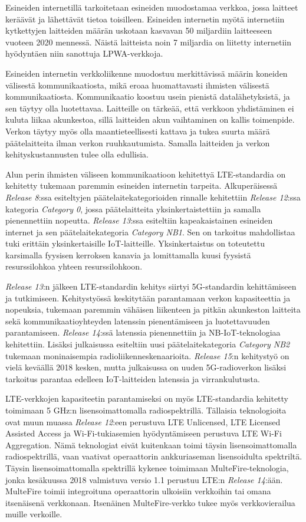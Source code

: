 \documentclass[finnish, 12pt, a4paper, elec, latin1, utf8, online]{aaltothesis}
\begin{document}
Esineiden internetillä tarkoitetaan  esineiden muodostamaa verkkoa, jossa laitteet keräävät ja lähettävät tietoa toisilleen. Esineiden internetin myötä internetiin kytkettyjen laitteiden määrän uskotaan kasvavan 50 miljardiin laitteeseen vuoteen 2020 mennessä. Näistä laitteista noin 7 miljardia on liitetty internetiin hyödyntäen niin sanottuja LPWA-verkkoja.

Esineiden internetin verkkoliikenne muodostuu merkittävissä määrin koneiden välisestä kommunikaatiosta, mikä eroaa huomattavasti ihmisten välisestä kommunikaatiosta. Kommunikaatio koostuu usein pienistä datalähetyksistä, ja sen täytyy olla luotettavaa. Laitteille on tärkeää, että verkkoon yhdistäminen ei kuluta liikaa akunkestoa, sillä laitteiden akun vaihtaminen on kallis toimenpide. Verkon täytyy myös olla maantieteellisesti kattava ja tukea suurta määrä päätelaitteita ilman verkon ruuhkautumista. Samalla laitteiden ja verkon kehityskustannusten tulee olla edullisia.

Alun perin ihmisten väliseen kommunikaatioon kehitettyä LTE-standardia on kehitetty tukemaan paremmin esineiden internetin tarpeita. Alkuperäisessä \textit{Release 8}:ssa esiteltyjen päätelaitekategorioiden rinnalle kehitettiin \textit{Release 12}:ssa kategoria \textit{Category 0}, jossa päätelaitteita yksinkertaistettiin ja samalla pienennettiin nopeutta. \textit{Release 13}:ssa esiteltiin kapeakaistainen esineiden internet ja sen päätelaitekategoria \textit{Category NB1}. Sen on tarkoitus mahdollistaa tuki erittäin yksinkertaisille IoT-laitteille. Yksinkertaistus on toteutettu karsimalla fyysisen kerroksen kanavia ja lomittamalla kuusi fyysistä resurssilohkoa yhteen resurssilohkoon.

\textit{Release 13}:n jälkeen LTE-standardin kehitys siirtyi 5G-standardin kehittämiseen ja tutkimiseen. Kehitystyössä keskitytään parantamaan verkon kapasiteettia ja nopeuksia, tukemaan paremmin vähäisen liikenteen ja pitkän akunkeston laitteita sekä kommunikaatioyhteyden latenssin pienentämiseen ja luotettavuuden parantamiseen. \textit{Release 14}:ssä latenssia pienennettiin ja NB-IoT-teknologiaa kehitettiin. Lisäksi julkaisussa esiteltiin uusi päätelaitekategoria \textit{Category NB2} tukemaan moninaisempia radioliikenneskenaarioita. \textit{Release 15}:n kehitystyö on vielä keväällä 2018 kesken, mutta julkaisussa on uuden 5G-radioverkon lisäksi tarkoitus parantaa edelleen IoT-laitteiden latenssia ja virrankulutusta.

LTE-verkkojen kapasiteetin parantamiseksi on myös LTE-standardia kehitetty toimimaan 5 GHz:n lisensoimattomalla radiospektrillä. Tällaisia teknologioita ovat muun muassa \textit{Release 12}:een perustuva LTE Unlicensed, LTE Licensed Assisted Access ja Wi-Fi-tukiasemien hyödyntämiseen perustuva LTE Wi-Fi Aggregation. Nämä teknologiat eivät kuitenkaan toimi täysin lisensoimattomalla radiospektrillä, vaan vaativat operaattorin ankkuriaseman lisensoidulta spektriltä. Täysin lisensoimattomalla spektrillä kykenee toimimaan MulteFire-teknologia, jonka kesäkuussa 2018 valmistuva versio 1.1 perustuu LTE:n \textit{Release 14}:ään. MulteFire toimii integroituna operaattorin ulkoisiin verkkoihin tai omana itsenäisenä verkkonaan. Itsenäinen MulteFire-verkko tukee myös verkkovierailua muille verkoille.
\end{document}
